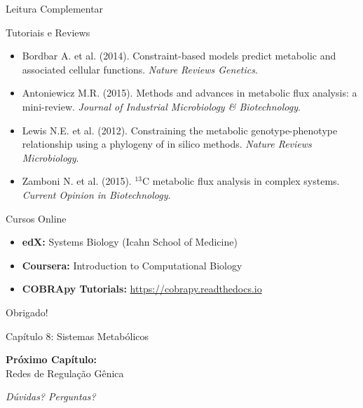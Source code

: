 \begin{frame}{Leitura Complementar}
\begin{block}{Tutoriais e Reviews}
\begin{itemize}
    \item Bordbar A. et al. (2014). Constraint-based models predict metabolic and associated cellular functions. \textit{Nature Reviews Genetics}.

    \item Antoniewicz M.R. (2015). Methods and advances in metabolic flux analysis: a mini-review. \textit{Journal of Industrial Microbiology \& Biotechnology}.

    \item Lewis N.E. et al. (2012). Constraining the metabolic genotype-phenotype relationship using a phylogeny of in silico methods. \textit{Nature Reviews Microbiology}.

    \item Zamboni N. et al. (2015). $^{13}$C metabolic flux analysis in complex systems. \textit{Current Opinion in Biotechnology}.
\end{itemize}
\end{block}

\begin{block}{Cursos Online}
\begin{itemize}
    \item \textbf{edX:} Systems Biology (Icahn School of Medicine)
    \item \textbf{Coursera:} Introduction to Computational Biology
    \item \textbf{COBRApy Tutorials:} \url{https://cobrapy.readthedocs.io}
\end{itemize}
\end{block}
\end{frame}

\begin{frame}
\begin{center}
{\Huge Obrigado!}

\vspace{1cm}

{\Large Capítulo 8: Sistemas Metabólicos}

\vspace{1cm}

\textbf{Próximo Capítulo:}\\
Redes de Regulação Gênica

\vspace{1cm}

\textit{Dúvidas? Perguntas?}
\end{center}
\end{frame}


